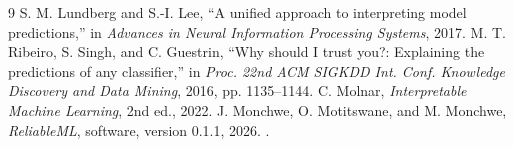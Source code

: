 \documentclass[conference]{IEEEtran}
\begin{document}
\begin{thebibliography}{9}
 S. M. Lundberg and S.-I. Lee, ``A unified approach to interpreting model predictions,'' in \emph{Advances in Neural Information Processing Systems}, 2017.
 M. T. Ribeiro, S. Singh, and C. Guestrin, ``Why should I trust you?: Explaining the predictions of any classifier,'' in \emph{Proc. 22nd ACM SIGKDD Int. Conf. Knowledge Discovery and Data Mining}, 2016, pp. 1135--1144.
 C. Molnar, \emph{Interpretable Machine Learning}, 2nd ed., 2022.
 J. Monchwe, O. Motitswane, and M. Monchwe, \emph{ReliableML}, software, version 0.1.1, 2026. \projecturl.
\end{thebibliography}
\end{document}
